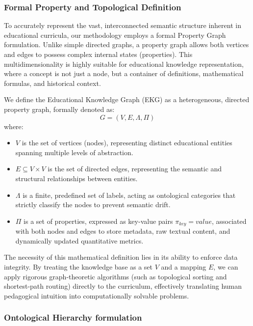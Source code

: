 \subsubsection{Formal Property and Topological Definition}

To accurately represent the vast, interconnected semantic structure inherent in educational curricula, our methodology employs a formal Property Graph formulation. Unlike simple directed graphs, a property graph allows both vertices and edges to possess complex internal states (properties). This multidimensionality is highly suitable for educational knowledge representation, where a concept is not just a node, but a container of definitions, mathematical formulas, and historical context.

We define the Educational Knowledge Graph (EKG) as a heterogeneous, directed property graph, formally denoted as:
\begin{equation}
    G = (V, E, \Lambda, \Pi)
\end{equation}
where:
\begin{itemize}
    \item $V$ is the set of vertices (nodes), representing distinct educational entities spanning multiple levels of abstraction.
    \item $E \subseteq V \times V$ is the set of directed edges, representing the semantic and structural relationships between entities.
    \item $\Lambda$ is a finite, predefined set of labels, acting as ontological categories that strictly classify the nodes to prevent semantic drift.
    \item $\Pi$ is a set of properties, expressed as key-value pairs $\pi_{key} = value$, associated with both nodes and edges to store metadata, raw textual content, and dynamically updated quantitative metrics.
\end{itemize}

The necessity of this mathematical definition lies in its ability to enforce data integrity. By treating the knowledge base as a set $V$ and a mapping $E$, we can apply rigorous graph-theoretic algorithms (such as topological sorting and shortest-path routing) directly to the curriculum, effectively translating human pedagogical intuition into computationally solvable problems.

\subsubsection{Ontological Hierarchy formulation}

